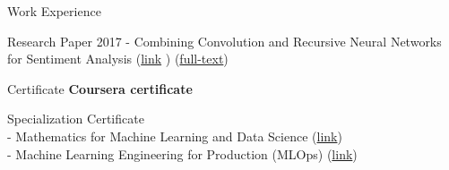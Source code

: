 \documentclass{resume} %
\begin{document}
\begin{rSection}{Work Experience}
{{{{{{\begin{rSection}{Research Paper}
2017 - Combining Convolution and Recursive Neural Networks for Sentiment Analysis (\href{https://dl.acm.org/doi/abs/10.1145/3155133.3155158}{link}  )
(\href{https://github.com/ttpro1995/soICT2017/releases/tag/v1.1}{full-text})
\end{rSection}




\begin{rSection}{Certificate}
{\bf Coursera certificate }

Specialization Certificate 
\\ - Mathematics for Machine Learning and Data Science (\href{https://coursera.org/share/ae3f40effbceedf3488075d566a95551}{link})
\\ - Machine Learning Engineering for Production (MLOps) (\href{https://coursera.org/share/ce5ec378a0075b8ffdbd5b235f8a84bd}{link})



\end{rSection}}}}}}}
\end{rSection}
\end{document}
